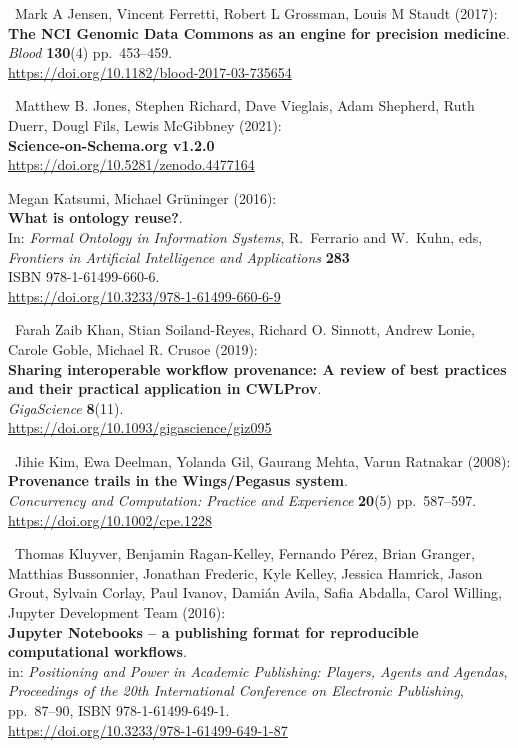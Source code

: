 \begin{thebibliography}{9}
~Mark A Jensen, Vincent Ferretti, Robert L Grossman, Louis M
Staudt (2017):\\
\textbf{The NCI Genomic Data Commons as an engine for precision
medicine}.\\
\emph{Blood} \textbf{130}(4) pp.~453--459.\\
\url{https://doi.org/10.1182/blood-2017-03-735654}

~Matthew B. Jones, Stephen Richard, Dave Vieglais, Adam
Shepherd, Ruth Duerr, Dougl Fils, Lewis McGibbney (2021):\\
\textbf{Science-on-Schema.org v1.2.0}\\
\url{https://doi.org/10.5281/zenodo.4477164}

 Megan Katsumi, Michael Grüninger (2016):\\
\textbf{What is ontology reuse?}.\\
In: \emph{Formal Ontology in Information Systems}, R.~Ferrario and
W.~Kuhn, eds,\\
\emph{Frontiers in Artificial Intelligence and Applications}
\textbf{283}\\
ISBN 978-1-61499-660-6.\\
\url{https://doi.org/10.3233/978-1-61499-660-6-9}

~Farah Zaib Khan, Stian Soiland-Reyes, Richard O. Sinnott,
Andrew Lonie, Carole Goble, Michael R. Crusoe (2019):\\
\textbf{Sharing interoperable workflow provenance: A review of best
practices and their practical application in CWLProv}.\\
\emph{GigaScience} \textbf{8}(11).\\
\url{https://doi.org/10.1093/gigascience/giz095}

~Jihie Kim, Ewa Deelman, Yolanda Gil, Gaurang Mehta, Varun
Ratnakar (2008):\\
\textbf{Provenance trails in the Wings/Pegasus system}.\\
\emph{Concurrency and Computation: Practice and Experience}
\textbf{20}(5) pp.~587--597.\\
\url{https://doi.org/10.1002/cpe.1228}

~Thomas Kluyver, Benjamin Ragan-Kelley, Fernando Pérez, Brian
Granger, Matthias Bussonnier, Jonathan Frederic, Kyle Kelley, Jessica
Hamrick, Jason Grout, Sylvain Corlay, Paul Ivanov, Damián Avila, Safia
Abdalla, Carol Willing, Jupyter Development Team (2016):\\
\textbf{Jupyter Notebooks -- a publishing format for reproducible
computational workflows}.\\
in: \emph{Positioning and Power in Academic Publishing: Players, Agents
and Agendas},\\
\emph{Proceedings of the 20th International Conference on Electronic
Publishing}, pp.~87--90, ISBN 978-1-61499-649-1.\\
\url{https://doi.org/10.3233/978-1-61499-649-1-87}


\end{thebibliography}

